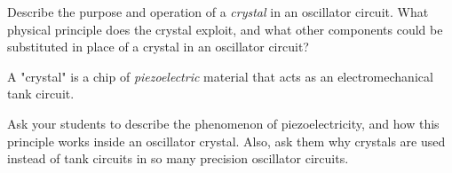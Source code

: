 

Describe the purpose and operation of a {\it crystal} in an oscillator circuit.  What physical principle does the crystal exploit, and what other components could be substituted in place of a crystal in an oscillator circuit?







A "crystal" is a chip of {\it piezoelectric} material that acts as an electromechanical tank circuit.







Ask your students to describe the phenomenon of piezoelectricity, and how this principle works inside an oscillator crystal.  Also, ask them why crystals are used instead of tank circuits in so many precision oscillator circuits.




